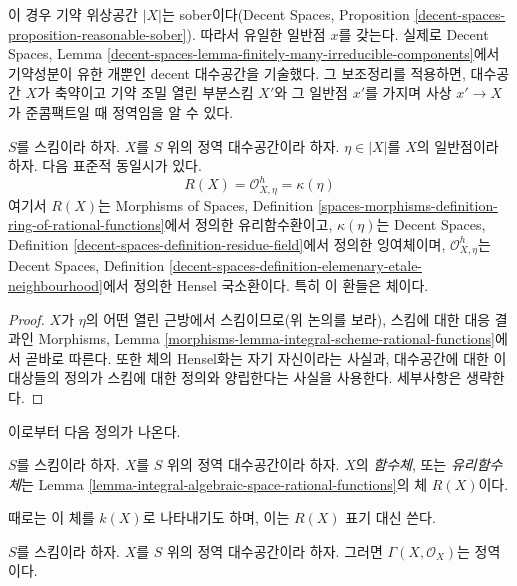 \noindent
이 경우 기약 위상공간 $|X|$는 sober이다(Decent Spaces, Proposition
\ref{decent-spaces-proposition-reasonable-sober}). 따라서 유일한 일반점
$x$를 갖는다. 실제로 Decent Spaces, Lemma
\ref{decent-spaces-lemma-finitely-many-irreducible-components}에서 기약성분이
유한 개뿐인 decent 대수공간을 기술했다. 그 보조정리를 적용하면,
대수공간 $X$가 축약이고 기약 조밀 열린 부분스킴 $X'$와 그 일반점
$x'$를 가지며 사상 $x' \to X$가 준콤팩트일 때 정역임을 알 수 있다.

\begin{lemma}
\label{lemma-integral-algebraic-space-rational-functions}
$S$를 스킴이라 하자. $X$를 $S$ 위의 정역 대수공간이라 하자.
$\eta \in |X|$를 $X$의 일반점이라 하자. 다음 표준적 동일시가 있다.
$$
R(X) = \mathcal{O}_{X, \eta}^h = \kappa(\eta)
$$
여기서 $R(X)$는 Morphisms of Spaces, Definition
\ref{spaces-morphisms-definition-ring-of-rational-functions}에서 정의한
유리함수환이고, $\kappa(\eta)$는 Decent Spaces, Definition
\ref{decent-spaces-definition-residue-field}에서 정의한 잉여체이며,
$\mathcal{O}_{X, \eta}^h$는 Decent Spaces, Definition
\ref{decent-spaces-definition-elemenary-etale-neighbourhood}에서 정의한
Hensel 국소환이다. 특히 이 환들은 체이다.
\end{lemma}

\begin{proof}
$X$가 $\eta$의 어떤 열린 근방에서 스킴이므로(위 논의를 보라), 스킴에
대한 대응 결과인 Morphisms, Lemma
\ref{morphisms-lemma-integral-scheme-rational-functions}에서 곧바로 따른다.
또한 체의 Hensel화는 자기 자신이라는 사실과, 대수공간에 대한 이
대상들의 정의가 스킴에 대한 정의와 양립한다는 사실을 사용한다.
세부사항은 생략한다.
\end{proof}

\noindent
이로부터 다음 정의가 나온다.

\begin{definition}
\label{definition-function-field}
$S$를 스킴이라 하자. $X$를 $S$ 위의 정역 대수공간이라 하자.
$X$의 {\it 함수체}, 또는 {\it 유리함수체}는 Lemma
\ref{lemma-integral-algebraic-space-rational-functions}의 체 $R(X)$이다.
\end{definition}

\noindent
때로는 이 체를 $k(X)$로 나타내기도 하며, 이는 $R(X)$ 표기 대신 쓴다.

\begin{lemma}
\label{lemma-integral-sections}
$S$를 스킴이라 하자. $X$를 $S$ 위의 정역 대수공간이라 하자. 그러면
$\Gamma(X, \mathcal{O}_X)$는 정역이다.
\end{lemma}

